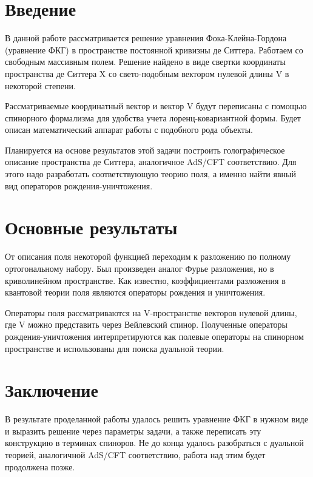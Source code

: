 \documentclass[12pt]{article}
\begin{document}


\ToC


\section*{Введение}
В данной работе рассматривается решение уравнения Фока-Клейна-Гордона (уравнение ФКГ) в пространстве постоянной кривизны де Ситтера. Работаем со свободным массивным полем. Решение найдено в виде свертки координаты пространства де Ситтера X со свето-подобным вектором нулевой длины V в некоторой степени. 

Рассматриваемые координатный вектор и вектор V будут переписаны с помощью спинорного формализма для удобства учета лоренц-ковариантной формы. Будет описан математический аппарат работы с подобного рода объекты.

Планируется на основе результатов этой задачи построить голографическое описание пространства де Ситтера, аналогичное AdS/CFT соответствию. Для этого надо разработать соответствующую теорию поля, а именно найти явный вид операторов рождения-уничтожения. 


\section*{Основные результаты}
От описания поля некоторой функцией переходим к разложению по полному ортогональному набору. Был произведен аналог Фурье разложения, но в криволинейном пространстве. Как известно, коэффициентами разложения в квантовой теории поля являются операторы рождения и уничтожения.

 Операторы поля рассматриваются на V-пространстве векторов нулевой длины, где V можно представить через Вейлевский спинор. Полученные операторы рождения-уничтожения интерпретируются как полевые операторы на спинорном пространстве и использованы для поиска дуальной теории.
 

\section*{Заключение}
В результате проделанной работы удалось решить уравнение ФКГ в нужном виде и выразить решение через параметры задачи, а также переписать эту конструкцию в терминах спиноров. Не до конца удалось разобраться с дуальной теорией, аналогичной AdS/CFT соответствию, работа над этим будет продолжена позже\cite{V04r,Asch_self,Hwa,Forster_Nelson77}.
\end{document}
